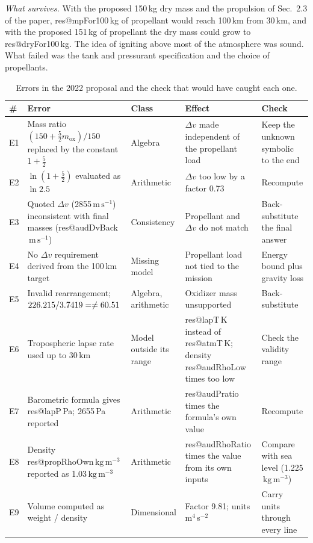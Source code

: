 \documentclass[11pt,a4paper]{article}
\makeatletter
\newcommand{\R}[1]{\csname res@#1\endcsname}
\newcommand{\ms}{\,\mathrm{m\,s^{-1}}}
\newcommand{\kgm}{\,\mathrm{kg\,m^{-3}}}
\makeatother
\begin{document}
\emph{What survives.} With the proposed 150\,kg dry mass and the propulsion of Sec.~2.3 of the paper, \R{mpFor100}\,kg of propellant would reach 100\,km from 30\,km, and with the proposed 151\,kg of propellant the dry mass could grow to \R{dryFor100}\,kg. The idea of igniting above most of the atmosphere was sound. What failed was the tank and pressurant specification and the choice of propellants.

\begin{table}[p]
\centering
\caption{Errors in the 2022 proposal and the check that would have caught each one.}
\label{tab:audit}
\footnotesize
\begin{tabular}{@{}l>{\raggedright\arraybackslash}p{5.0cm}>{\raggedright\arraybackslash}p{2.0cm}>{\raggedright\arraybackslash}p{3.6cm}>{\raggedright\arraybackslash}p{3.2cm}@{}}
\toprule
\# & Error & Class & Effect & Check \\
\midrule
E1 & Mass ratio $(150+\tfrac52 m_{\mathrm{ox}})/150$ replaced by the constant $1+\tfrac52$ & Algebra & $\Delta v$ made independent of the propellant load & Keep the unknown symbolic to the end \\
E2 & $\ln(1+\tfrac52)$ evaluated as $\ln 2.5$ & Arithmetic & $\Delta v$ too low by a factor 0.73 & Recompute \\
E3 & Quoted $\Delta v$ (2855$\ms$) inconsistent with final masses (\R{audDvBack}$\ms$) & Consistency & Propellant and $\Delta v$ do not match & Back-substitute the final answer \\
E4 & No $\Delta v$ requirement derived from the 100\,km target & Missing model & Propellant load not tied to the mission & Energy bound plus gravity loss \\
E5 & Invalid rearrangement; $226.215/3.7419=\R{audDiv}\neq 60.51$ & Algebra, arithmetic & Oxidizer mass unsupported & Back-substitute \\
E6 & Tropospheric lapse rate used up to 30\,km & Model outside its range & \R{lapT}\,K instead of \R{atmT}\,K; density \R{audRhoLow} times too low & Check the validity range \\
E7 & Barometric formula gives \R{lapP}\,Pa; 2655\,Pa reported & Arithmetic & \R{audPratio} times the formula's own value & Recompute \\
E8 & Density \R{propRhoOwn}$\kgm$ reported as 1.03$\kgm$ & Arithmetic & \R{audRhoRatio} times the value from its own inputs & Compare with sea level (1.225$\kgm$) \\
E9 & Volume computed as weight / density & Dimensional & Factor 9.81; units m$^4$\,s$^{-2}$ & Carry units through every line \\

\end{tabular}
\end{table}
\end{document}
